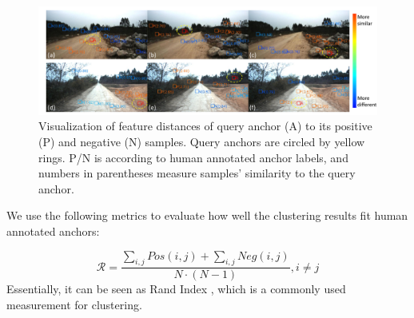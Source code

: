 \documentclass[letterpaper, 10 pt, conference]{ieeeconf}  %
\begin{document}
\begin{figure}[]
	\centering
	\includegraphics[scale=0.4]{anchor_dis.pdf}
	\caption{Visualization of feature distances of query anchor (A) to its positive (P) and negative (N) samples. Query anchors are circled by yellow rings. P/N is according to human annotated anchor labels, and numbers in parentheses measure samples' similarity to the query anchor.}
	\label{fig:anchor_dis}
\end{figure}

We use the following metrics to evaluate how well the clustering results fit human annotated anchors:

\begin{equation}
\mathcal{R}=\dfrac{\sum_{i,j}{Pos(i,j)}+\sum_{i,j}{Neg(i,j)}}{N\cdot (N-1)}, i \neq j
\end{equation}
Essentially, it can be seen as Rand Index \cite{rand1971objective}, which is a commonly used measurement for clustering.
\end{document}
